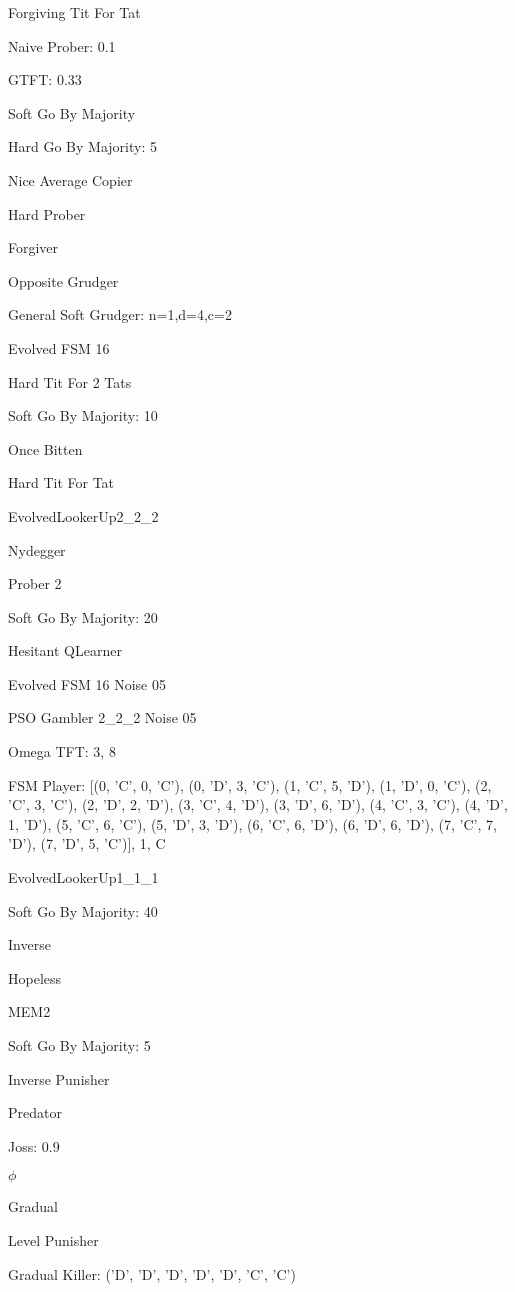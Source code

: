 \item Forgiving Tit For Tat
\item Naive Prober: 0.1
\item GTFT: 0.33
\item Soft Go By Majority
\item Hard Go By Majority: 5
\item Nice Average Copier
\item Hard Prober
\item Forgiver
\item Opposite Grudger
\item General Soft Grudger: n=1,d=4,c=2
\item Evolved FSM 16
\item Hard Tit For 2 Tats
\item Soft Go By Majority: 10
\item Once Bitten
\item Hard Tit For Tat
\item EvolvedLookerUp2\_2\_2
\item Nydegger
\item Prober 2
\item Soft Go By Majority: 20
\item Hesitant QLearner
\item Evolved FSM 16 Noise 05
\item PSO Gambler 2\_2\_2 Noise 05
\item Omega TFT: 3, 8
\item FSM Player: [(0, 'C', 0, 'C'), (0, 'D', 3, 'C'), (1, 'C', 5, 'D'), (1, 'D', 0, 'C'), (2, 'C', 3, 'C'), (2, 'D', 2, 'D'), (3, 'C', 4, 'D'), (3, 'D', 6, 'D'), (4, 'C', 3, 'C'), (4, 'D', 1, 'D'), (5, 'C', 6, 'C'), (5, 'D', 3, 'D'), (6, 'C', 6, 'D'), (6, 'D', 6, 'D'), (7, 'C', 7, 'D'), (7, 'D', 5, 'C')], 1, C
\item EvolvedLookerUp1\_1\_1
\item Soft Go By Majority: 40
\item Inverse
\item Hopeless
\item MEM2
\item Soft Go By Majority: 5
\item Inverse Punisher
\item Predator
\item Joss: 0.9
\item $\phi$
\item Gradual
\item Level Punisher
\item Gradual Killer: ('D', 'D', 'D', 'D', 'D', 'C', 'C')
